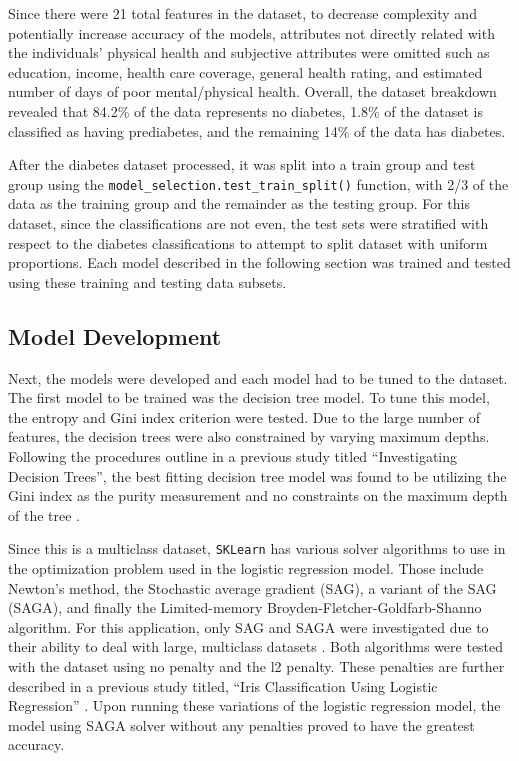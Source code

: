 \documentclass[journal]{IEEEtran}
\begin{document}
Since there were 21 total features in the dataset, to decrease complexity and potentially increase accuracy of the models, attributes not directly related with the individuals' physical health and subjective attributes were omitted such as education, income, health care coverage, general health rating, and estimated number of days of poor mental/physical health. Overall, the dataset breakdown revealed that 84.2\% of the data represents no diabetes, 1.8\% of the dataset is classified as having prediabetes, and the remaining 14\% of the data has diabetes. 

After the diabetes dataset processed, it was split into a train group and test group using the \lstinline{model_selection.test_train_split()} function, with 2/3 of the data as the training group and the remainder as the testing group. For this dataset, since the classifications are not even, the test sets were stratified with respect to the diabetes classifications to attempt to split dataset with uniform proportions. Each model described in the following section was trained and tested using these training and testing data subsets. 

\subsection{Model Development}

Next, the models were developed and each model had to be tuned to the dataset. The first model to be trained was the decision tree model. To tune this model, the entropy and Gini index criterion were tested. Due to the large number of features, the decision trees were also constrained by varying maximum depths. Following the procedures outline in a previous study titled “Investigating Decision Trees”, the best fitting decision tree model was found to be utilizing the Gini index as the purity measurement and no constraints on the maximum depth of the tree \cite{b4}.

Since this is a multiclass dataset, \lstinline{SKLearn} has various solver algorithms to use in the optimization problem used in the logistic regression model. Those include Newton's method, the Stochastic average gradient (SAG), a variant of the SAG (SAGA), and finally the Limited-memory Broyden-Fletcher-Goldfarb-Shanno algorithm. For this application, only SAG and SAGA were investigated due to their ability to deal with large, multiclass datasets \cite{b5}. Both algorithms were tested with the dataset using no penalty and the l2 penalty. These penalties are further described in a previous study titled, “Iris Classification Using Logistic Regression” \cite{b6}. Upon running these variations of the logistic regression model, the model using SAGA solver without any penalties proved to have the greatest accuracy.  
\end{document}

